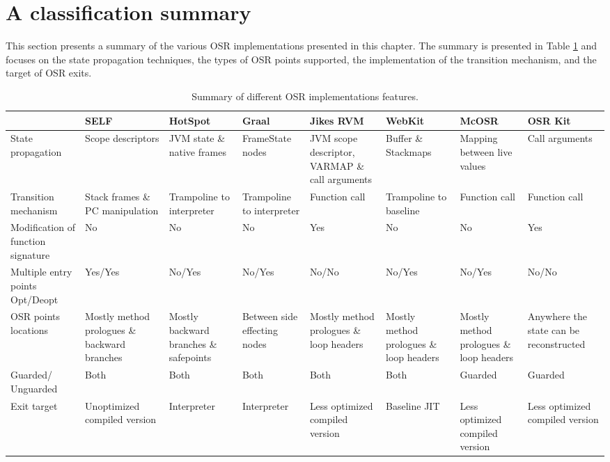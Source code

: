 \section{A classification summary}
This section presents a summary of the various OSR implementations presented in this chapter.
The summary is presented in Table \ref{tab:Summary} and focuses on the state propagation techniques, the types of OSR points supported, the implementation of the transition mechanism, and the target of OSR exits.\\

\clearpage

\begin{landscape}
\begin{table}[h!]
\centering
\begin{tabular}{|p{}|
                 p{}|
                 p{}|
                 p{}|
                 p{}|
                 p{}|
                 p{}|
                 p{}|}
\hline
& SELF & HotSpot & Graal & Jikes RVM & WebKit & McOSR & OSR Kit \\ \hline
State propagation & Scope descriptors & JVM state \& native frames & FrameState nodes & JVM scope descriptor, VARMAP \& call arguments & Buffer \& Stackmaps & Mapping between live values & Call arguments \\ \hline
Transition mechanism & Stack frames \& PC manipulation & Trampoline to interpreter & Trampoline to interpreter & Function call & Trampoline to baseline & Function call & Function call \\ \hline
Modification of function signature & No & No & No & Yes & No & No & Yes \\ \hline
Multiple \shortstack{entry points \\ Opt/Deopt} & Yes/Yes & No/Yes & No/Yes & No/No & No/Yes & No/Yes & No/No \\ \hline
OSR points locations & Mostly method prologues \& backward branches & Mostly backward branches \& safepoints & Between side effecting nodes & Mostly method prologues \& loop headers & Mostly method prologues \& loop headers & Mostly method prologues \& loop headers & Anywhere the state can be reconstructed \\ \hline
Guarded/ Unguarded & Both & Both & Both & Both & Both & Guarded & Guarded \\ \hline
Exit target & Unoptimized compiled version & Interpreter & Interpreter & Less optimized compiled version & Baseline JIT & Less optimized compiled version & Less optimized compiled version \\ \hline
\end{tabular}
\caption{Summary of different OSR implementations features.}
\label{tab:Summary}
\end{table}
\end{landscape}
\clearpage